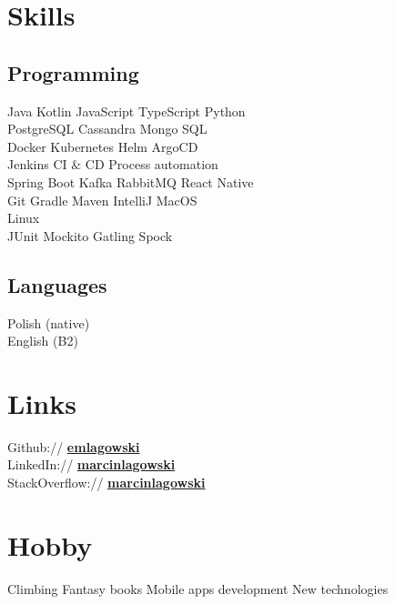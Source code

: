 
\section{Skills}
\subsection{Programming}
Java \textbullet{}
Kotlin \textbullet{}
JavaScript \textbullet{}
TypeScript \textbullet{}
Python \\
PostgreSQL \textbullet{}   
Cassandra \textbullet{} 
Mongo \textbullet{} 
SQL \\
Docker \textbullet{} 
Kubernetes \textbullet{}
Helm \textbullet{}  
ArgoCD \\ 
Jenkins \textbullet{} 
CI \& CD Process automation\\
Spring Boot \textbullet{} 
Kafka \textbullet{} 
RabbitMQ \textbullet{} 
React Native \\
Git \textbullet{} 
Gradle \textbullet{} 
Maven \textbullet{}
IntelliJ \textbullet{}
MacOS \\
Linux \\
JUnit \textbullet{} 
Mockito \textbullet{} 
Gatling \textbullet{} 
Spock \\
\sectionsep
\subsection{Languages}
Polish (native) \\
English (B2)
\sectionsep


\section{Links} 
Github:// \href{https://github.com/emlagowski}{\textbf{emlagowski}} \\
LinkedIn://  \href{https://www.linkedin.com/in/marcinlagowski}{\textbf{marcinlagowski}} \\
StackOverflow://  \href{http://stackoverflow.com/users/3233685/marcin-lagowski}{\textbf{marcinlagowski}} 
\sectionsep


\section{Hobby}
Climbing \textbullet{}   
Fantasy books \textbullet{} 
Mobile apps development \textbullet{} 
New technologies \\

%
%
